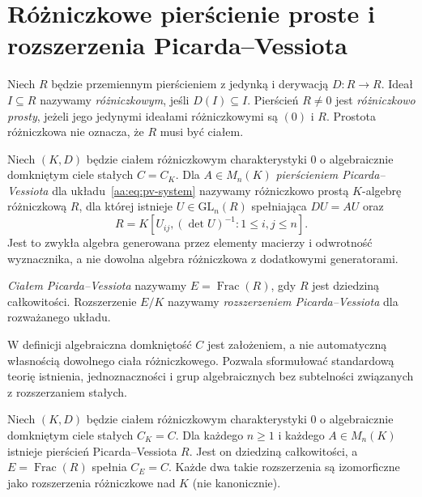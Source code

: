 \section{Różniczkowe pierścienie proste i rozszerzenia Picarda--Vessiota}

\begin{definicja}
\label{aa:def:pv-differential-ideal}
Niech $R$ będzie przemiennym pierścieniem
z jedynką i derywacją $D:R\to R$.
Ideał $I\subseteq R$ nazywamy
\emph{różniczkowym}, jeśli $D(I)\subseteq I$.
Pierścień $R\ne0$ jest
\emph{różniczkowo prosty}, jeżeli
jego jedynymi ideałami różniczkowymi
są $(0)$ i $R$.
Prostota różniczkowa nie oznacza,
że $R$ musi być ciałem.
\end{definicja}

\begin{definicja}
\label{aa:def:pv-extension}
Niech $(K,D)$ będzie ciałem różniczkowym
charakterystyki $0$ o algebraicznie
domkniętym ciele stałych $C=C_K$.
Dla $A\in M_n(K)$
\emph{pierścieniem Picarda--Vessiota}
dla układu~\eqref{aa:eq:pv-system}
nazywamy różniczkowo prostą
$K$-algebrę różniczkową $R$,
dla której istnieje
$U\in\mathrm{GL}_n(R)$ spełniająca
$DU=AU$ oraz
\[
 R=K[U_{ij},(\det U)^{-1}:
          1\le i,j\le n].
\]
Jest to zwykła algebra generowana
przez elementy macierzy i odwrotność
wyznacznika, a nie dowolna algebra
różniczkowa z dodatkowymi generatorami.

\emph{Ciałem Picarda--Vessiota} nazywamy
$E=\operatorname{Frac}(R)$, gdy $R$
jest dziedziną całkowitości.
Rozszerzenie $E/K$ nazywamy
\emph{rozszerzeniem Picarda--Vessiota}
dla rozważanego układu.
\end{definicja}

W definicji algebraiczna domkniętość $C$
jest założeniem, a nie automatyczną
własnością dowolnego ciała różniczkowego.
Pozwala sformułować standardową
teorię istnienia, jednoznaczności
i grup algebraicznych bez subtelności
związanych z rozszerzaniem stałych.

\begin{twierdzenie}
\label{aa:tw:pv-existence-uniqueness}
Niech $(K,D)$ będzie ciałem różniczkowym
charakterystyki $0$ o algebraicznie
domkniętym ciele stałych $C_K=C$.
Dla każdego $n\ge1$ i każdego
$A\in M_n(K)$ istnieje pierścień
Picarda--Vessiota $R$.
Jest on dziedziną całkowitości,
a $E=\operatorname{Frac}(R)$ spełnia
$C_E=C$. Każde dwa takie rozszerzenia
są izomorficzne jako rozszerzenia
różniczkowe nad $K$
(nie kanonicznie).
\end{twierdzenie}

